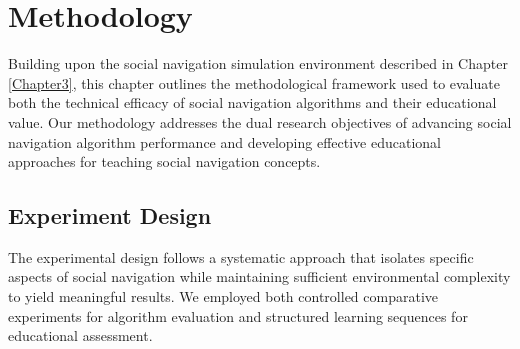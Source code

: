 
\chapter{Methodology} %

\label{Chapter4} %

Building upon the social navigation simulation environment described in Chapter 
\ref{Chapter3}, this chapter outlines the methodological framework used 
to evaluate both the technical efficacy of social navigation algorithms and their 
educational value. Our methodology addresses the dual research objectives of 
advancing social navigation algorithm performance and developing effective 
educational approaches for teaching social navigation concepts.

\section{Experiment Design}\label{sec:experiment_design}
The experimental design follows a systematic approach that isolates specific 
aspects of social navigation while maintaining sufficient environmental complexity 
to yield meaningful results. We employed both controlled comparative experiments 
for algorithm evaluation and structured learning sequences for educational 
assessment.

